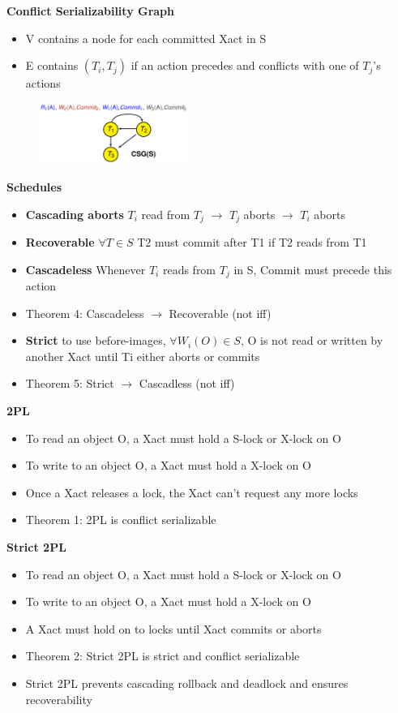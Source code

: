 \documentclass[10pt, landscape]{article}
\begin{document}
\begin{multicols}{4}
\textbf{Conflict Serializability Graph} \\
\begin{itemize}
  \item V contains a node for each committed Xact in S
  \item E contains $(T_i, T_j)$ if an action precedes and conflicts with one of $T_j$'s actions
\end{itemize}
\includegraphics[width=7cm, height =2cm]{csg.png}

\textbf{Schedules} \\
\begin{itemize} 
  \item \textbf{Cascading aborts} $T_i$ read from $T_j$ $\rightarrow$ $T_j$ aborts $\rightarrow$ $T_i$ aborts
  \item \textbf{Recoverable} $\forall T \in S$ T2 must commit after T1 if T2 reads from T1
  \item \textbf{Cascadeless} Whenever $T_i$ reads from $T_j$ in S, Commit must precede this action
  \item Theorem 4: Cascadeless $\rightarrow$ Recoverable (not iff)
  \item \textbf{Strict}  to use before-images, $\forall W_i(O) \in S$, O is not read or written by another Xact until Ti either aborts or commits
  \item Theorem 5: Strict $\rightarrow$ Cascadless (not iff)
\end{itemize}

\textbf{2PL} \\
\begin{itemize} 
  \item To read an object O, a Xact must hold a S-lock or X-lock on O 
  \item To write to an object O, a Xact must hold a X-lock on O 
  \item Once a Xact releases a lock, the Xact can't request any more locks
  \item Theorem 1: 2PL is conflict serializable
\end{itemize}

\textbf{Strict 2PL} \\
\begin{itemize}
  \item To read an object O, a Xact must hold a S-lock or X-lock on O 
  \item To write to an object O, a Xact must hold a X-lock on O 
  \item A Xact must hold on to locks until Xact commits or aborts
  \item Theorem 2: Strict 2PL is strict and conflict serializable
  \item Strict 2PL prevents cascading rollback and deadlock and ensures recoverability
\end{itemize}


\end{multicols}
\end{document}
